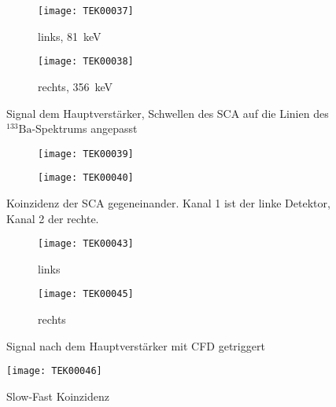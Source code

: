 \documentclass[11pt, ngerman, fleqn, DIV=15, headinclude, BCOR=2cm]{scrreprt}
\begin{document}
\fehlt%


\begin{figure}
	\centering
	\begin{subfigure}{0.49 \textwidth}
		\texttt{[image: TEK00037]}
		\caption{%
			links, \SI{81}{\kilo\electronvolt}
		}
		\label{fig:ba_slow_signal_sca_eingestellt-li}
	\end{subfigure}
	\begin{subfigure}{0.49 \textwidth}
		\texttt{[image: TEK00038]}
		\caption{%
			rechts, \SI{356}{\kilo\electronvolt}
		}
		\label{fig:ba_slow_signal_sca_eingestellt-re}
	\end{subfigure}
	\caption{%
		Signal dem Hauptverstärker, Schwellen des SCA auf die Linien
		des $^{133}\text{Ba}$-Spektrums angepasst
	}
	\label{fig:ba_slow_signal_sca_eingestellt}
\end{figure}

\fehlt%

\begin{figure}
	\centering
	\begin{subfigure}{0.49 \textwidth}
		\texttt{[image: TEK00039]}
	\end{subfigure}
	\begin{subfigure}{0.49 \textwidth}
		\texttt{[image: TEK00040]}
	\end{subfigure}
	\caption{%
		Koinzidenz der SCA gegeneinander. Kanal 1 ist der linke
		Detektor, Kanal 2 der rechte.
	}
	\label{fig:ba_slow_signal_sca_koinzidenz}
\end{figure}



\begin{figure}
	\centering
	\begin{subfigure}{0.49 \textwidth}
		\texttt{[image: TEK00043]}
		\caption{%
			links
		}
		\label{fig:ba_fast_signal_cfd_trig-li}
	\end{subfigure}
	\begin{subfigure}{0.49 \textwidth}
		\texttt{[image: TEK00045]}
		\caption{%
			rechts
		}
		\label{fig:ba_fast_signal_cfd_trig-re}
	\end{subfigure}
	\caption{%
		Signal nach dem Hauptverstärker mit CFD getriggert
	}
	\label{fig:ba_fast_signal_cfd_trig}
\end{figure}

\begin{figure}
	\centering
	\texttt{[image: TEK00046]}
	\caption{%
		Slow-Fast Koinzidenz
	}
	\label{fig:ba_slow_fast_koinzidenz}
\end{figure}
\end{document}
